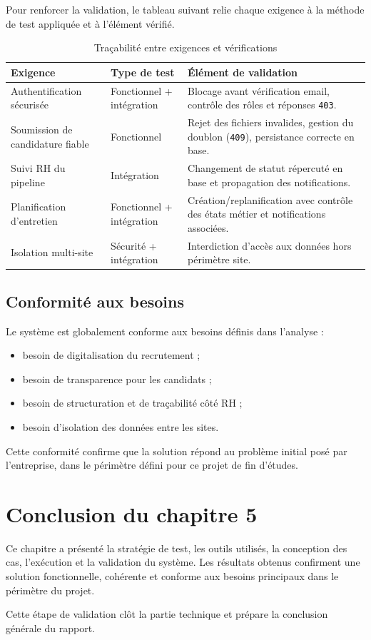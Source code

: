 Pour renforcer la validation, le tableau suivant relie chaque exigence
à la méthode de test appliquée et à l'élément vérifié.

\begin{table}[H]
\centering
\caption{Traçabilité entre exigences et vérifications}
\begin{tabularx}{\textwidth}{|X|l|X|}
\hline
\textbf{Exigence} & \textbf{Type de test} & \textbf{Élément de validation} \\
\hline
Authentification sécurisée & Fonctionnel + intégration & Blocage avant vérification email, contrôle des rôles et réponses \texttt{403}. \\
\hline
Soumission de candidature fiable & Fonctionnel & Rejet des fichiers invalides, gestion du doublon (\texttt{409}), persistance correcte en base. \\
\hline
Suivi RH du pipeline & Intégration & Changement de statut répercuté en base et propagation des notifications. \\
\hline
Planification d'entretien & Fonctionnel + intégration & Création/replanification avec contrôle des états métier et notifications associées. \\
\hline
Isolation multi-site & Sécurité + intégration & Interdiction d'accès aux données hors périmètre site. \\
\hline
\end{tabularx}
\end{table}

\subsection{Conformité aux besoins}

Le système est globalement conforme aux besoins définis dans l'analyse :
\begin{itemize}
    \item besoin de digitalisation du recrutement ;
    \item besoin de transparence pour les candidats ;
    \item besoin de structuration et de traçabilité côté RH ;
    \item besoin d'isolation des données entre les sites.
\end{itemize}

Cette conformité confirme que la solution répond au problème initial posé
par l'entreprise, dans le périmètre défini pour ce projet de fin d'études.

\section*{Conclusion du chapitre 5}

Ce chapitre a présenté la stratégie de test, les outils utilisés, la
conception des cas, l'exécution et la validation du système.
Les résultats obtenus confirment une solution fonctionnelle, cohérente et
conforme aux besoins principaux dans le périmètre du projet.

Cette étape de validation clôt la partie technique et prépare la conclusion
générale du rapport.
